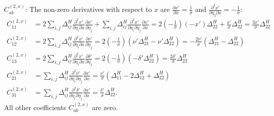 \documentclass{article}
\begin{document}
$C^{(2,x)}_{ab}$:
The non-zero derivatives with respect to $x$ are $\frac{\partial x'}{\partial x} = \frac{1}{\sigma}$ and $\frac{\partial^2 x'}{\partial \eta_2 \partial x} = -\frac{1}{\sigma}$:
%
\begin{align}
  C^{(2,x)}_{11} & = 2 \sum_{i,j} \Delta^H_{ij} \frac{\partial^2 x'}{\partial\eta_i\partial x}\frac{\partial x'}{\partial\eta_j} + \sum_{i,j} \Delta^H_{ij} \frac{\partial^2 x'}{\partial\eta_i\partial\eta_j}\frac{\partial x'}{\partial x} = 2(-\tfrac{1}{\sigma})(-x')\Delta^H_{22} + \frac{x'}{\sigma}\Delta^H_{22} = \frac{3x'}{\sigma}\Delta^H_{22} \\
  C^{(2,x)}_{12} & = 2 \sum_{i,j} \Delta^H_{ij} \frac{\partial^2 x'}{\partial\eta_i\partial x}\frac{\partial \nu'}{\partial\eta_j} = 2(-\tfrac{1}{\sigma}) (\nu'\Delta^H_{21} - \nu'\Delta^H_{22}) = -\frac{2\nu'}{\sigma}(\Delta^H_{21} - \Delta^H_{22})                                                                                                 \\
  C^{(2,x)}_{13} & = 2 \sum_{i,j} \Delta^H_{ij} \frac{\partial^2 x'}{\partial\eta_i\partial x}\frac{\partial \delta'}{\partial\eta_j} = 2(-\tfrac{1}{\sigma})(-\delta'\Delta^H_{22}) = \frac{2\delta'}{\sigma}\Delta^H_{22}                                                                                                                               \\
  C^{(2,x)}_{21} & = \sum_{i,j} \Delta^H_{ij} \frac{\partial^2 \nu'}{\partial\eta_i\partial\eta_j}\frac{\partial x'}{\partial x} = \frac{\nu'}{\sigma}(\Delta^H_{11} - 2\Delta^H_{12} + \Delta^H_{22})                                                                                                                                                    \\
  C^{(2,x)}_{31} & = \sum_{i,j} \Delta^H_{ij} \frac{\partial^2 \delta'}{\partial\eta_i\partial\eta_j}\frac{\partial x'}{\partial x} = \frac{\delta'}{\sigma}\Delta^H_{22}.
\end{align}
%
All other coefficients $C^{(2,x)}_{ab}$ are zero.
\end{document}
